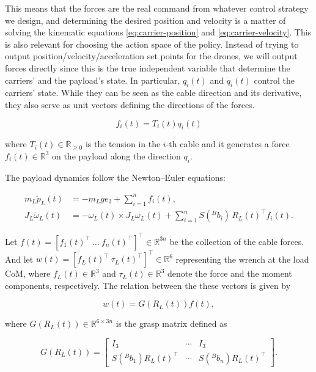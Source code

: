 This means that the forces are the real command from whatever control
strategy we design, and determining the desired position and velocity is
a matter of solving the kinematic equations \eqref{eq:carrier-position}
and \eqref{eq:carrier-velocity}. This is also relevant for choosing the
action space of the policy. Instead of trying to output
position/velocity/acceleration set points for the drones, we will output
forces directly since this is the true independent variable that
determine the carriers’ and the payload’s state. In particular, $q_i(t)$
and $\dot{q}_i(t)$ control the carriers’ state. While they can be seen as
the cable direction and its derivative, they also serve as unit vectors
defining the directions of the forces.

\begin{equation}
  f_i(t) = T_i(t) q_i(t)
  \label{eq:cable-force}
\end{equation}

where $T_i(t) \in \mathbb{R}_{\geq 0}$ is the tension in the $i$-th cable
and it generates a force $f_i(t) \in \mathbb{R}^3$ on the payload along
the direction $q_i$.

The payload dynamics follow the Newton–Euler equations:

\begin{align}
  m_L \ddot{p}_L(t) &= -m_L g e_3 + \sum_{i=1}^n f_i(t), \label{eq:newton} \\
  J_L \dot{\omega}_L(t) &= -\omega_L(t) \times J_L \omega_L(t) + \sum_{i=1}^n S({}^{B}b_i)\, R_L(t)^\top f_i(t). \label{eq:euler}
\end{align}

Let $f(t) = [f_1(t)^\top \ \dots \ f_n(t)^\top]^\top \in \mathbb{R}^{3n}$
be the collection of the cable forces. And let $w(t) =
[f_L(t)^\top\ \tau_L(t)^\top]^\top \in \mathbb{R}^6$ representing the
wrench at the load CoM, where $f_L(t) \in \mathbb{R}^3$ and $\tau_L(t) \in
\mathbb{R}^3$ denote the force and the moment components, respectively.
The relation between the these vectors is given by

\begin{equation}
  w(t) = G(R_L(t)) f(t),
  \label{eq:wrench-map}
\end{equation}

where $G(R_L(t)) \in \mathbb{R}^{6 \times 3n}$ is the grasp matrix defined
as

\begin{equation}
  G(R_L(t)) = \begin{bmatrix} I_3 & \cdots & I_3 \\ S({}^{B}b_1) R_L(t)^\top & \cdots & S({}^{B}b_n) R_L(t)^\top \end{bmatrix}.
  \label{eq:grasp-matrix}
\end{equation}

